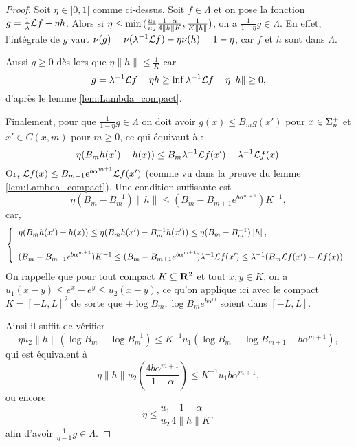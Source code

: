   \begin{proof}
    Soit $\eta \in ]0, 1[$ comme ci-dessus. Soit $f \in \Lambda$ et on pose la fonction $g = \frac 1 \lambda \L f - \eta h$.
    Alors si $\eta \leq \min{(\frac{u_1}{u_2} \frac{1-\alpha}{4\No{h}K}, \frac 1 {K\lVert h\rVert})}$,
    on a $\frac 1 {1-\eta}g \in \Lambda$.
    En effet, l'intégrale de $g$ vaut $\nu(g) = \nu(\lambda^{-1}\L f) -\eta\nu(h) = 1 - \eta$, car $f$ et $h$ sont dans $\Lambda$.

    Aussi $g \geq 0$ dès lors que $\eta \lVert h\rVert \leq \frac 1 K$ car
    $$g = \lambda^{-1}\L f - \eta h \geq \inf{\lambda^{-1}\L f} - \eta\lVert h\rVert \geq 0,$$
    d'après le lemme \ref{lem:Lambda_compact}.

    Finalement, pour que $\frac 1 {1 - \eta}g \in \Lambda$ on doit avoir $g(x) \leq B_mg(x')$ pour $x \in \sp_n$ et $x'\in C(x,m)$ pour $m \geq 0$,
    ce qui équivaut à :
    $$\eta(B_mh(x') - h(x)) \leq B_m \lambda^{-1}\L f(x') - \lambda^{-1}\L f(x).$$
    Or, $\L f(x) \leq B_{m+1}e^{b\alpha^{m+1}}\L f(x')$ (comme vu dans la preuve du lemme \ref{lem:Lambda_compact}).
    Une condition suffisante est
    $$\eta(B_m - B_m^{-1})\lVert h\rVert \leq (B_m - B_{m+1}e^{b\alpha^{m+1}})K^{-1},$$
    car,
    $$\left\{
    \begin{array}{l}
      \eta(B_mh(x') - h(x)) \leq \eta(B_mh(x') - B_m^{-1}h(x')) \leq \eta(B_m-B_m^{-1})\lVert h\rVert, \vspace{1.5em}\\
      (B_m - B_{m+1}e^{b\alpha^{m+1}})K^{-1} \leq (B_m - B_{m+1}e^{b\alpha^{m+1}})\lambda^{-1}\L f(x') \leq \lambda^{-1}(B_m\L f(x') - \L f(x)).
    \end{array}\right.$$
    On rappelle que pour tout compact $K \subseteq \R^2$ et tout $x,y \in K$, on a
    $u_1(x-y) \leq e^x - e^y \leq u_2(x-y)$, ce qu'on applique ici avec le compact $K = [-L, L]^2$ de sorte que $\pm\log B_m, \log{B_m e^{b\alpha^m}}$
    soient dans $[-L, L]$.

    Ainsi il suffit de vérifier
    $$\eta u_2\lVert h\rVert(\log{B_m} - \log{B_m^{-1}}) \leq K^{-1}u_1(\log{B_m} - \log{B_{m+1}} - b\alpha^{m+1}),$$
    qui est équivalent à
    $$\eta\lVert h\rVert u_2 \left(\frac{4b\alpha^{m+1}}{1-\alpha}\right) \leq K^{-1}u_1b\alpha^{m+1},$$
    ou encore
    $$\eta \leq \frac{u_1}{u_2}\frac{1-\alpha}{4\lVert h\rVert K},$$
    afin d'avoir $\frac 1 {\eta - 1}g \in \Lambda$.
  \end{proof}

